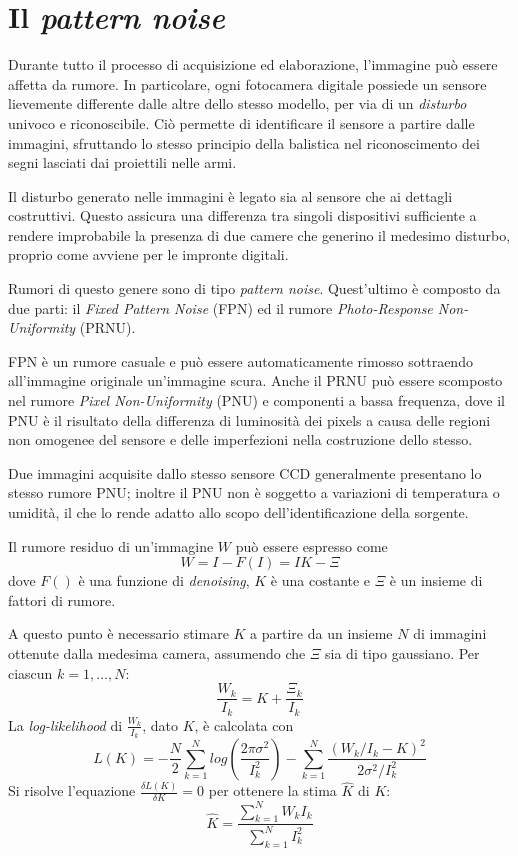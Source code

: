 \section{Il \emph{pattern noise}}

Durante tutto il processo di acquisizione ed elaborazione, l'immagine può essere affetta da rumore. 
In particolare, ogni fotocamera digitale possiede un sensore
lievemente differente dalle altre dello stesso modello, per via di un \emph{disturbo}
univoco e riconoscibile. Ciò permette di identificare il sensore a partire dalle
immagini, sfruttando lo stesso principio della balistica nel riconoscimento dei segni lasciati dai proiettili nelle armi.

Il disturbo generato nelle immagini è legato sia al sensore che ai dettagli costruttivi. Questo
assicura una differenza tra singoli dispositivi sufficiente a rendere improbabile
la presenza di due camere che generino il medesimo disturbo, proprio come avviene per le impronte digitali. 

Rumori di questo genere sono di tipo \emph{pattern noise}. Quest'ultimo è composto da due parti: il \emph{Fixed Pattern Noise} (FPN) ed il rumore \emph{Photo-Response Non-Uniformity} (PRNU).

FPN è un rumore casuale e può essere automaticamente rimosso sottraendo all'immagine originale un'immagine scura. Anche il PRNU può essere scomposto nel rumore \emph{Pixel Non-Uniformity} (PNU) e componenti a bassa frequenza, dove il PNU è il risultato della differenza di luminosità dei pixels a causa delle regioni non omogenee del sensore e delle imperfezioni nella costruzione dello stesso.

Due immagini acquisite dallo stesso sensore CCD generalmente presentano lo stesso rumore PNU; inoltre il PNU non è soggetto a variazioni di temperatura o umidità, il che lo rende adatto allo scopo dell'identificazione della sorgente.

Il rumore residuo di un'immagine $W$ può essere espresso come
\begin{equation}
W = I - F(I) = IK - \Xi
\end{equation}
dove $F()$ è una funzione di \emph{denoising}, $K$ è una costante e $\Xi$ è un insieme di fattori di rumore.

A questo punto è necessario stimare $K$ a partire da un insieme $N$ di immagini ottenute dalla medesima camera, assumendo che $\Xi$ sia di tipo gaussiano. Per ciascun $k = 1, \ldots, N$:
\begin{equation}
\frac{W_k}{I_k} = K + \frac{\Xi_k}{I_k}
\end{equation}
La \emph{log-likelihood} di $\frac{W_k}{I_k}$, dato $K$, è calcolata con
\begin{equation}
L(K) = -\frac{N}{2} \sum_{k = 1}^{N} log(\frac{2\pi\sigma^2}{I_{k}^{2}}) -  \sum_{k = 1}^{N} \frac{(W_k / I_k - K)^2}{2\sigma^2 / I_{k}^{2}}
\end{equation}
Si risolve l'equazione $\frac{\delta L(K)}{\delta K} = 0$ per ottenere la stima $\hat{K}$ di $K$:
\begin{equation}
\hat{K} = \frac{\sum_{k = 1}^{N} W_k I_k}{\sum_{k = 1}^{N} I_{k}^{2}}
\end{equation}

